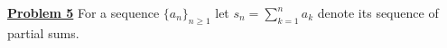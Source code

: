 \documentclass[12pt]{article}
\begin{document}
%
%
%
%
%
%
%
%
%
%
%
%
%
\textbf{\underline{Problem 5}} 
For a sequence $\{a_n\}_{n \geq 1}$ let $s_n = \sum^n_{k=1} a_k$ denote its sequence of partial sums.
\end{document}
